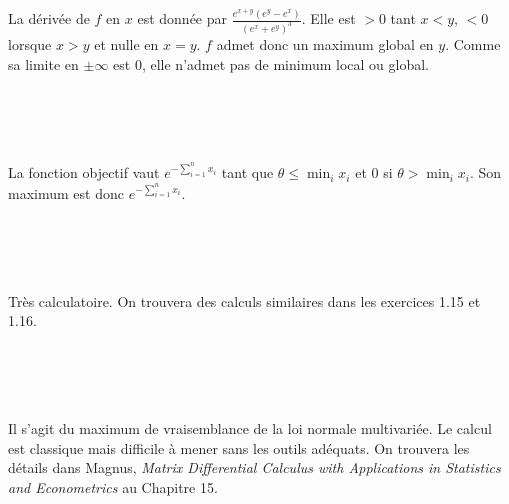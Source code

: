 \documentclass{report}
\begin{document}
\subsection{} \noindent{}\\ 
\\ 
\\
\noindent La dérivée de $f$ en $x$ est donnée par $\displaystyle \frac{e^{x+y} \left(e^y-e^x\right)}{\left(e^x+e^y\right)^3}$.\newline
Elle est $>0$ tant $x< y$, $<0$ lorsque $x> y$ et nulle en $x=y$. $f$ admet donc un maximum global en $y$. Comme sa limite en $\pm \infty$ est $0$, elle n'admet pas de minimum local ou global.\newline

\subsection{} \noindent{}\\ 
\\ 
\\
\noindent La fonction objectif vaut $e^{-\sum_{i=1}^n x_i}$ tant que $\theta \leq \min_i x_i$ et $0$ si $\theta > \min_i x_i$. Son maximum est donc $e^{-\sum_{i=1}^n x_i}$. 


\subsection{} \noindent\fbox{
\parbox{\linewidth}{

}}\\ 
\\ 
\\
\noindent Très calculatoire. On trouvera des calculs similaires dans les exercices 1.15 et 1.16.

\subsection{} \noindent\fbox{
\parbox{\linewidth}{

}}\\ 
\\ 
\\
\noindent Il s'agit du maximum de vraisemblance de la loi normale multivariée. Le calcul est classique mais difficile à mener sans les outils adéquats. On trouvera les détails dans Magnus, \textit{Matrix Differential Calculus with Applications in Statistics and Econometrics} au Chapitre 15.
\end{document}
